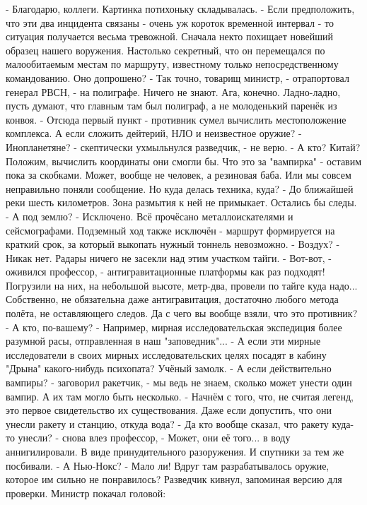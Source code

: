  - Благодарю, коллеги.
Картинка потихоньку складывалась.
 - Если предположить, что эти два инцидента связаны - очень уж короток временной интервал - то ситуация получается весьма тревожной. Сначала некто похищает новейший образец нашего воружения. Настолько секретный, что он перемещался по малообитаемым местам по маршруту, известному только непосредственному командованию. Оно допрошено?
 - Так точно, товарищ министр, - отрапортовал генерал РВСН, - на полиграфе. Ничего не знают.
Ага, конечно. Ладно-ладно, пусть думают, что главным там был полиграф, а не молоденький паренёк из конвоя.
 - Отсюда первый пункт - противник сумел вычислить местоположение комплекса. А если сложить дейтерий, НЛО и неизвестное оружие?
 - Инопланетяне? - скептически ухмыльнулся разведчик, - не верю.
 - А кто? Китай? Положим, вычислить координаты они смогли бы. Что это за "вампирка" - оставим пока за скобками. Может, вообще не человек, а резиновая баба. Или мы совсем неправильно поняли сообщение. Но куда делась техника, куда?
 - До ближайшей реки шесть километров. Зона размытия к ней не примыкает. Остались бы следы.
 - А под землю?
 - Исключено. Всё прочёсано металлоискателями и сейсмографами. Подземный ход также исключён - маршрут формируется на краткий срок, за который выкопать нужный тоннель невозможно.
 - Воздух?
 - Никак нет. Радары ничего не засекли над этим участком тайги.
 - Вот-вот, - оживился профессор, - антигравитационные платформы как раз подходят! Погрузили на них, на небольшой высоте, метр-два, провели по тайге куда надо... Собственно, не обязательна даже антигравитация, достаточно любого метода полёта, не оставляющего следов. Да с чего вы вообще взяли, что это противник?
 - А кто, по-вашему?
 - Например, мирная исследовательская экспедиция более разумной расы, отправленная в наш "заповедник"...
 - А если эти мирные исследователи в своих мирных исследовательских целях посадят в кабину "Дрына" какого-нибудь психопата?
Учёный замолк.
 - А если действительно вампиры? - заговорил ракетчик, - мы ведь не знаем, сколько может унести один вампир. А их там могло быть несколько.
 - Начнём с того, что, не считая легенд, это первое свидетельство их существования. Даже если допустить, что они унесли ракету и станцию, откуда вода?
 - Да кто вообще сказал, что ракету куда-то унесли? - снова влез профессор, - Может, они её того... в воду аннигилировали. В виде принудительного разоружения. И спутники за тем же посбивали.
 - А Нью-Нокс?
 - Мало ли! Вдруг там разрабатывалось оружие, которое им сильно не понравилось?
Разведчик кивнул, запоминая версию для проверки. Министр покачал головой:
